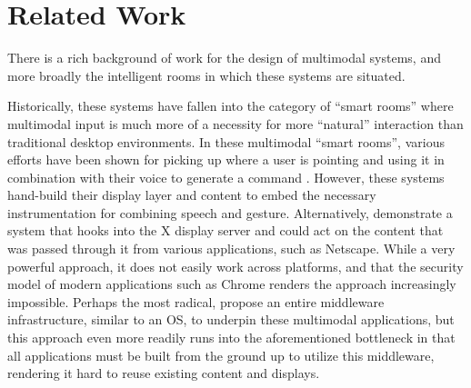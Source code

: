 \section{Related Work}

There is a rich background of work for the design of multimodal systems, and more broadly the intelligent rooms
in which these systems are situated.

Historically, these systems have fallen into the category of ``smart rooms''
where multimodal input is much more of a necessity for more ``natural''
interaction than traditional desktop environments. In these multimodal
``smart rooms'', various efforts have been shown for picking up
where a user is pointing and using it in combination with
their voice to generate a command
\cite{bolt_put-that-there:_1980,carbini_wizard_2006,langner_multiple_2019,farrell_symbiotic_2016,kephart_embodied_2019}.
However, these systems hand-build their display layer and
content to embed the necessary instrumentation for combining speech
and gesture. Alternatively, \cite{coen_design_1998,brooks_intelligent_1997} demonstrate a system that
hooks into the X display server and could act on the content that was passed through
it from various applications, such as Netscape. While a very powerful approach, it
does not easily work across platforms, and that the security model of modern
applications such as Chrome renders the approach
increasingly impossible. Perhaps the most radical, \cite{roman_middleware_2002} propose an entire middleware infrastructure, similar to an OS,
to underpin these multimodal applications, but this approach
even more readily runs into the aforementioned bottleneck
in that all applications must be built from the ground up to
utilize this middleware, rendering it hard to reuse existing
content and displays.

